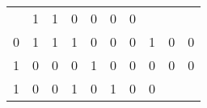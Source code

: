 \begin{tabular}{|c|c|c|c||c|c|c|c|c|c|}
    & 1
  
    
    
    & 1
  
    
    
    & 0
  
    
    
    & 0
  
    
    
    & 0
  
    
    
    & 0
   \\
  

  
  
  0 & 1 & 1 & 1
  
    
    
    & 0
  
    
    
    & 0
  
    
    
    & 0
  
    
    
    & 1
  
    
    
    & 0
  
    
    
    & 0
   \\
  \hline

  
  
  1 & 0 & 0 & 0
  
    
    
    & 1
  
    
    
    & 0
  
    
    
    & 0
  
    
    
    & 0
  
    
    
    & 0
  
    
    
    & 0
   \\
  

  
  
  1 & 0 & 0 & 1
  
    
    
    & 0
  
    
    
    & 1
  
    
    
    & 0
  
    
    
    & 0
  

\end{tabular}
